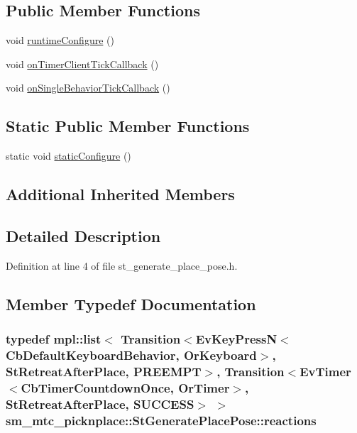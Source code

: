 \subsection*{Public Member Functions}
\begin{DoxyCompactItemize}
\item 
void \hyperlink{structsm__mtc__picknplace_1_1StGeneratePlacePose_a2ee3f00686bb27813da950c93b680f6c}{runtime\+Configure} ()
\item 
void \hyperlink{structsm__mtc__picknplace_1_1StGeneratePlacePose_aab518eeb39277d6dd1cf07397a4580ec}{on\+Timer\+Client\+Tick\+Callback} ()
\item 
void \hyperlink{structsm__mtc__picknplace_1_1StGeneratePlacePose_a1b95ce5c3778f50c408a7407ad05f4b4}{on\+Single\+Behavior\+Tick\+Callback} ()
\end{DoxyCompactItemize}
\subsection*{Static Public Member Functions}
\begin{DoxyCompactItemize}
\item 
static void \hyperlink{structsm__mtc__picknplace_1_1StGeneratePlacePose_aec0531217742f84bae9369f7f7d443a9}{static\+Configure} ()
\end{DoxyCompactItemize}
\subsection*{Additional Inherited Members}


\subsection{Detailed Description}


Definition at line 4 of file st\+\_\+generate\+\_\+place\+\_\+pose.\+h.



\subsection{Member Typedef Documentation}
\subsubsection[{\texorpdfstring{reactions}{reactions}}]{\setlength{\rightskip}{0pt plus 5cm}typedef mpl\+::list$<$ Transition$<$Ev\+Key\+PressN$<$Cb\+Default\+Keyboard\+Behavior, {\bf Or\+Keyboard}$>$, {\bf St\+Retreat\+After\+Place}, {\bf P\+R\+E\+E\+M\+PT}$>$, Transition$<$Ev\+Timer$<$Cb\+Timer\+Countdown\+Once, {\bf Or\+Timer}$>$, {\bf St\+Retreat\+After\+Place}, {\bf S\+U\+C\+C\+E\+SS}$>$ $>$ {\bf sm\+\_\+mtc\+\_\+picknplace\+::\+St\+Generate\+Place\+Pose\+::reactions}}\hypertarget{structsm__mtc__picknplace_1_1StGeneratePlacePose_a2bfa3dcbc33e47fdc4d8c918cfdcdbe7}{}\label{structsm__mtc__picknplace_1_1StGeneratePlacePose_a2bfa3dcbc33e47fdc4d8c918cfdcdbe7}


